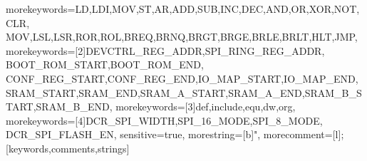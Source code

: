 %
 {morekeywords={LD,LDI,MOV,ST,AR,ADD,SUB,INC,DEC,AND,OR,XOR,NOT,CLR,%
	MOV,LSL,LSR,ROR,ROL,BREQ,BRNQ,BRGT,BRGE,BRLE,BRLT,HLT,JMP},%
morekeywords=[2]{DEVCTRL_REG_ADDR,SPI_RING_REG_ADDR,%
	BOOT_ROM_START,BOOT_ROM_END,%
	CONF_REG_START,CONF_REG_END,IO_MAP_START,IO_MAP_END,%
	SRAM_START,SRAM_END,SRAM_A_START,SRAM_A_END,SRAM_B_START,SRAM_B_END},%
morekeywords=[3]{def,include,equ,dw,org},%
morekeywords=[4]{DCR_SPI_WIDTH,SPI_16_MODE,SPI_8_MODE,%
	DCR_SPI_FLASH_EN},%
   sensitive=true,%
   morestring=[b]",
   morecomment=[l];%
   }[keywords,comments,strings]

